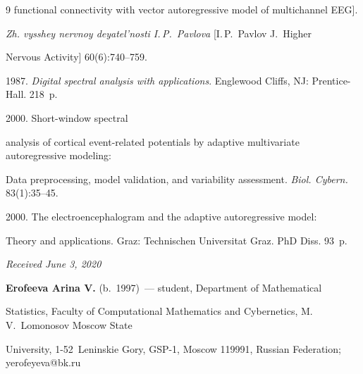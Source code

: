 {{\begin{thebibliography}{9}
functional connectivity with vector autoregressive model of multichannel EEG]. 


\textit{Zh. vysshey nervnoy deyatel'nosti I.\,P.~Pavlova} [I.\,P.~Pav\-lov J.~Higher 


Nervous Activity] 60(6):740--759.




 1987. \textit{Digital spectral analysis with applications}. Englewood Cliffs, NJ: Prentice-Hall. 218~p.




 2000. Short-window spectral 


analysis of cortical event-related potentials by adaptive multivariate autoregressive modeling:


 Data preprocessing, model validation, and variability assessment. \textit{Biol. Cybern.} 83(1):35--45.




 2000. The electroencephalogram and the adaptive autoregressive model:


 Theory and applications.  Graz: Technischen Universitat Graz. PhD Diss.  93~p.


\end{thebibliography}


} }










\hfill{\small\textit{Received June 3, 2020}} 













\Contr





\noindent


\textbf{Erofeeva Arina V.} (b.\ 1997)~--- student, Department of Mathematical 


Statistics, Faculty of Computational Mathematics and Cybernetics, M.\,V.~Lomonosov Moscow State 


University, 1-52~Leninskie Gory, GSP-1, Moscow 119991, Russian Federation; \mbox{yerofeyeva@bk.ru}





